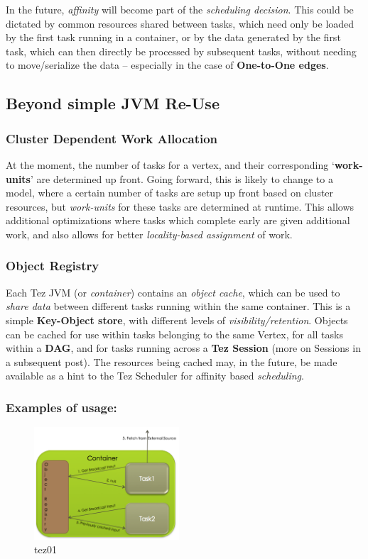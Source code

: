 \documentclass[twocolumn]{article}
\begin{document}
In the future, \emph{affinity} will become part of the \emph{scheduling
decision}. This could be dictated by common resources shared between
tasks, which need only be loaded by the first task running in a
container, or by the data generated by the first task, which can then
directly be processed by subsequent tasks, without needing to
move/serialize the data -- especially in the case of \textbf{One-to-One
edges}.

\subsection{Beyond simple JVM Re-Use}

\subsubsection{Cluster Dependent Work Allocation}

At the moment, the number of tasks for a vertex, and their corresponding
`\textbf{work-units}' are determined up front. Going forward, this is
likely to change to a model, where a certain number of tasks are setup
up front based on cluster resources, but \emph{work-units} for these
tasks are determined at runtime. This allows additional optimizations
where tasks which complete early are given additional work, and also
allows for better \emph{locality-based assignment} of work.

\subsubsection{Object Registry}

Each Tez JVM (or \emph{container}) contains an \emph{object cache},
which can be used to \emph{share data} between different tasks running
within the same container. This is a simple \textbf{Key-Object store},
with different levels of \emph{visibility/retention}. Objects can be
cached for use within tasks belonging to the same Vertex, for all tasks
within a \textbf{DAG}, and for tasks running across a \textbf{Tez
Session} (more on Sessions in a subsequent post). The resources being
cached may, in the future, be made available as a hint to the Tez
Scheduler for affinity based \emph{scheduling}.

\subsubsection{Examples of usage:}

\begin{figure}[htb]
        \centering
        \includegraphics[width=0.48\textwidth]{tez121}
        \caption{tez01}
        \label{fig16}
\end{figure}
\end{document}
